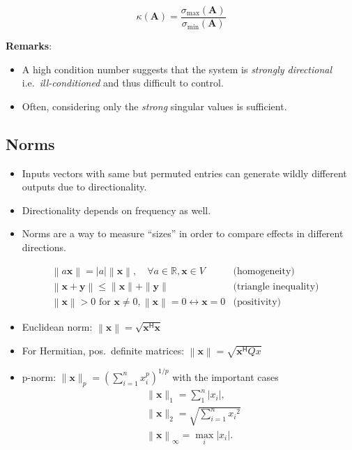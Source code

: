\newpar{}
\noindent\begin{equation*}
    \kappa(\mathbf{A})=\frac{\sigma_{\max}(\mathbf{A})}{\sigma_{\min}(\mathbf{A})}
\end{equation*}

\textbf{Remarks}:
\begin{itemize}
    \item A high condition number suggests that the system is \textit{strongly directional} i.e.\ \textit{ill-conditioned} and thus difficult to control.
    \item Often, considering only the \textit{strong} singular values is sufficient.
\end{itemize}

\subsection{Norms}
\begin{itemize}
    \item Inputs vectors with same but permuted entries can generate wildly different outputs due to directionality.
    \item Directionality depends on frequency as well.
    \item Norms are a way to measure ``sizes'' in order to compare effects in different directions.
\end{itemize}

\begin{align*}
     & \left\| a\mathbf{x}\right\|  =\left|a\right|\left\|\mathbf{x}\right\|,\quad\forall a\in\mathbb{R},\mathbf{x}\in V                 & \text{(homogeneity)}         \\
     & \left\|\mathbf{x}+\mathbf{y}\right\|                         \leq\|\mathbf{x}\|+\|\mathbf{y}\|                                    & \text{(triangle inequality)} \\
     & \left\|\mathbf{x}\right\|                >0 \text{ for } \mathbf{x}\neq0, \left\|\mathbf{x}\right\|=0\leftrightarrow \mathbf{x}=0 & \text{(positivity)}
\end{align*}

\begin{itemize}
    \item Euclidean norm: $\left\|\mathbf{x}\right\|=\sqrt{\mathbf{x}^{\mathsf{H}}\mathbf{x}}$
    \item For Hermitian, pos.\ definite matrices: $\left\|\mathbf{x}\right\|=\sqrt{\mathbf{x}^{\mathsf{H}} Qx}$
    \item p-norm: $\|\mathbf{x}\|_p{=\left(\sum_{i=1}^n x_i^p\right)}^{1/p}$ with the important cases
          \begin{align*}
               & \|\mathbf{x}\|_1=\sum_1^n\left|x_i\right|,               \\
               & \|\mathbf{x}\|_2=\sqrt{\sum_{i=1}^n {x_i}^2}             \\
               & \left\|\mathbf{x}\right\|_\infty=\max_i\left|x_i\right|.
          \end{align*}
\end{itemize}

